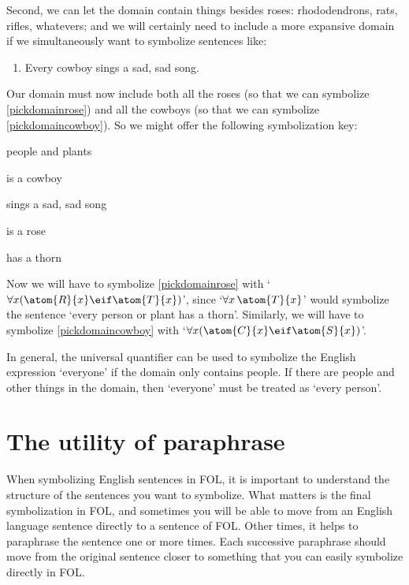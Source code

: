 Second, we can let the domain contain things besides roses: rhododendrons, rats, rifles,  whatevers; and we will certainly need to include a more expansive domain if we simultaneously want to symbolize sentences like:
	\begin{enumerate}
		\item\label{pickdomaincowboy} Every cowboy sings a sad, sad song.
	\end{enumerate}
Our domain must now include both all the roses (so that we can symbolize \cref*{pickdomainrose}) and all the cowboys (so that we can symbolize \cref*{pickdomaincowboy}). So we might offer the following symbolization key:
	\begin{ekey}
		\item[\text{domain}] people and plants
		\item[\atom{C}{x}]  is a cowboy
		\item[\atom{S}{x}]  sings a sad, sad song
		\item[\atom{R}{x}]  is a rose
		\item[\atom{T}{x}]  has a thorn
	\end{ekey}
Now we will have to symbolize \cref*{pickdomainrose} with `$\forall x (\atom{R}{x} \eif \atom{T}{x})$', since `$\forall x\, \atom{T}{x}$' would symbolize the sentence `every person or plant has a thorn'. Similarly, we will have to symbolize \cref*{pickdomaincowboy} with `$\forall x (\atom{C}{x} \eif \atom{S}{x})$'.

In general, the universal quantifier can be used to symbolize the English expression `everyone' if the domain only contains people. If there are people and other things in the domain, then `everyone' must be treated as `every person'.


\section{The utility of paraphrase}
When symbolizing English sentences in FOL, it is important to understand the structure of the sentences you want to symbolize. What matters is the final symbolization in FOL, and sometimes you will be able to move from an English language sentence directly to a sentence of FOL. Other times, it helps to paraphrase the sentence one or more times. Each successive paraphrase should move from the original sentence closer to something that you can easily symbolize directly in FOL.

